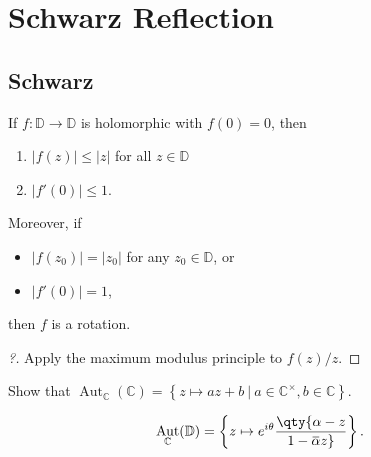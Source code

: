 \hypertarget{schwarz-reflection}{%
\section{Schwarz Reflection}\label{schwarz-reflection}}

\hypertarget{schwarz}{%
\subsection{Schwarz}\label{schwarz}}

\begin{theorem}\label{SchwarzzLemma}

If \(f: {\mathbb{D}}\to {\mathbb{D}}\) is holomorphic with \(f(0) = 0\),
then

\begin{enumerate}
\def\labelenumi{\arabic{enumi}.}
\tightlist
\item
  \({\left\lvert {f(z)} \right\rvert} \leq {\left\lvert {z} \right\rvert}\)
  for all \(z\in {\mathbb{D}}\)
\item
  \({\left\lvert {f'(0)} \right\rvert} \leq 1\).
\end{enumerate}

Moreover, if

\begin{itemize}
\tightlist
\item
  \({\left\lvert {f(z_0)} \right\rvert} = {\left\lvert {z_0} \right\rvert}\)
  for any \(z_0\in {\mathbb{D}}\), or
\item
  \({\left\lvert {f'(0)} \right\rvert} = 1\),
\end{itemize}

then \(f\) is a rotation.

\end{theorem}

\begin{proof}[?]

Apply the maximum modulus principle to \(f(z)/z\).

\end{proof}

\begin{exercise}[?]

Show that
\(\mathop{\mathrm{Aut}}_{\mathbb{C}}({\mathbb{C}}) = \left\{{ z \mapsto az+b{~\mathrel{\Big|}~}a\in {\mathbb{C}}^{\times}, b\in {\mathbb{C}}}\right\}\).

\end{exercise}

\begin{theorem}

\begin{align*}
\mathop{\mathrm{Aut}}_{\mathbb{C}}({\mathbb{D}}) = \left\{{ z\mapsto e^{i\theta} \qty{\alpha - z \over 1 - \mkern 1.5mu\overline{\mkern-1.5mu\alpha\mkern-1.5mu}\mkern 1.5mu z} }\right\}
.\end{align*}

\end{theorem}

